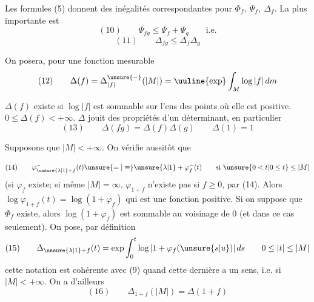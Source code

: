 Les formules (5) donnent des inégalités correspondantes pour \(\Phi_f,\ \Psi_f,\ \Delta_f\). La plus importante est
\[
(10)\qquad\Psi_{fg}\leq\Psi_f+\Psi_g\qquad\text{i.e.}
\]
\[
(11)\qquad\Delta_{fg}\leq\Delta_f\Delta_g
\]



On posera, pour une fonction mesurable 
\[
(12)\qquad\Delta(f)=\Delta^{\unsure{-}}_{|f|}(|M|)=\uuline{\exp}\int_M\log|f|\,dm
\]
\par{}
\(\Delta(f)\) existe  si \(\log|f|\) est sommable sur l'ens des points où elle est positive. \(0\leq\Delta(f)<+\infty\).
\(\Delta\) jouit des propriétés d'un  déterminant, en particulier
\[
(13)\qquad\Delta(fg)=\Delta(f)\Delta(g)\qquad\Delta(1)=1
\]

Supposons que \(|M|<+\infty\). On vérifie aussitôt que  \par{}\par{}
\[
(14)\qquad\varphi^-_{\unsure{\lambda|1}+f}(t)\unsure{=|\equiv}\unsure{\lambda|1}+\varphi_f^-(t)\qquad\text{si }\unsure{0<t|0\leq t}\leq|M|
\]
(si \(\varphi_f\) existe; si même \(|M|=\infty\), \(\varphi_{1+f}\) n'existe pas  si \(f\geq0\),   par (14). Alors \(\log\varphi_{1+f}(t)=\log(1+\varphi_f)\) qui est une fonction positive. Si on suppose que \(\Phi_f\) existe, alors \(\log(1+\varphi_f)\) est sommable au voisinage de \(0\) (et dans ce cas seulement). On pose, par définition
\[
(15)\qquad\Delta_{\unsure{\lambda|1}+f}(t)=\exp\int_0^t\log|1+\varphi_f(\unsure{s|u})|\,ds
\qquad0\leq|t|\leq|M|
\]
cette notation est cohérente avec (9) quand cette dernière a un sens, i.e. si \(|M|<+\infty\). On a d'ailleurs
\[
(16)\qquad\Delta_{1+f}(|M|)=\Delta(1+f)
\]

